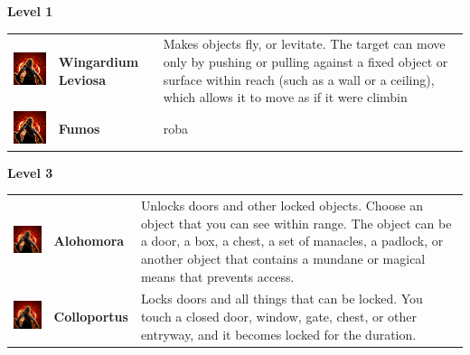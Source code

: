 \textbf{Level 1 } 
\begin{tabular}{ m{4cm}m{3cm}m{6cm} } 
	\includegraphics[width=4cm]{../Pictures/Gameplay/Spells/Icon/spell_icon.png} & \textbf{Wingardium Leviosa} & Makes objects fly, or levitate. The target can move only by pushing or pulling against a fixed object or surface within reach (such as a wall or a ceiling), which allows it to move as if it were climbin  \\ 
	\includegraphics[width=4cm]{../Pictures/Gameplay/Spells/Icon/spell_icon.png} & \textbf{Fumos} & roba \\ %
\end{tabular}
\textbf{Level 3} 
\begin{tabular}{ m{4cm}m{3cm}m{6cm} } 
	\includegraphics[width=4cm]{../Pictures/Gameplay/Spells/Icon/spell_icon.png} & \textbf{Alohomora} & Unlocks doors and other locked objects. Choose an object that you can see within range. The object can be a door, a box, a chest, a set of manacles, a padlock, or another object that contains a mundane or magical means that prevents access. \\ 
   \includegraphics[width=4cm]{../Pictures/Gameplay/Spells/Icon/spell_icon.png} & \textbf{Colloportus} &  Locks doors and all things that can be locked. You touch a closed door, window, gate, chest, or other entryway, and it becomes locked for the duration. \\ 
\end{tabular}
